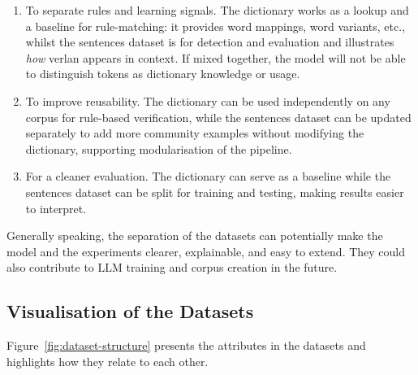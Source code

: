 \documentclass[12pt]{article}
\begin{document}
\begin{enumerate}
  \item To separate rules and learning signals. The dictionary works as a lookup and a baseline for rule-matching: it provides word mappings, word variants, etc., whilst the sentences dataset is for detection and evaluation and illustrates \textit{how} verlan appears in context. If mixed together, the model will not be able to distinguish tokens as dictionary knowledge or usage.
  \item To improve reusability. The dictionary can be used independently on any corpus for rule-based verification, while the sentences dataset can be updated separately to add more community examples without modifying the dictionary, supporting modularisation of the pipeline.
  \item For a cleaner evaluation. The dictionary can serve as a baseline while the sentences dataset can be split for training and testing, making results easier to interpret.
\end{enumerate}

Generally speaking, the separation of the datasets can potentially make the model and the experiments clearer, explainable, and easy to extend. They could also contribute to LLM training and corpus creation in the future.

\subsection{Visualisation of the Datasets}

Figure~\ref{fig:dataset-structure} presents the attributes in the datasets and highlights how they relate to each other.
\end{document}
